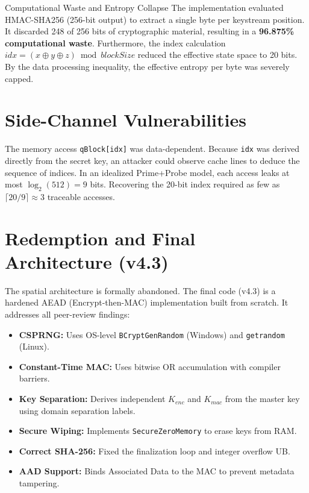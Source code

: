 \documentclass[12pt,a4paper]{article}
\begin{document}
\begin{critiquebox}{Computational Waste and Entropy Collapse}
The implementation evaluated HMAC-SHA256 (256-bit output) to extract a single byte per keystream position. It discarded 248 of 256 bits of cryptographic material, resulting in a \textbf{96.875\% computational waste}. Furthermore, the index calculation $idx = (x \oplus y \oplus z) \bmod blockSize$ reduced the effective state space to 20 bits. By the data processing inequality, the effective entropy per byte was severely capped.
\end{critiquebox}

\section{Side-Channel Vulnerabilities}
The memory access \texttt{qBlock[idx]} was data-dependent. Because \texttt{idx} was derived directly from the secret key, an attacker could observe cache lines to deduce the sequence of indices. In an idealized Prime+Probe model, each access leaks at most $\log_2(512) = 9$ bits. Recovering the 20-bit index required as few as \(\lceil 20/9 \rceil \approx 3\) traceable accesses.

\section{Redemption and Final Architecture (v4.3)}
The spatial architecture is formally abandoned. The final code (v4.3) is a hardened AEAD (Encrypt-then-MAC) implementation built from scratch. It addresses all peer-review findings:
\begin{itemize}
    \item \textbf{CSPRNG:} Uses OS-level \texttt{BCryptGenRandom} (Windows) and \texttt{getrandom} (Linux).
    \item \textbf{Constant-Time MAC:} Uses bitwise OR accumulation with compiler barriers.
    \item \textbf{Key Separation:} Derives independent \(K_{enc}\) and \(K_{mac}\) from the master key using domain separation labels.
    \item \textbf{Secure Wiping:} Implements \texttt{SecureZeroMemory} to erase keys from RAM.
    \item \textbf{Correct SHA-256:} Fixed the finalization loop and integer overflow UB.
    \item \textbf{AAD Support:} Binds Associated Data to the MAC to prevent metadata tampering.
\end{itemize}
\end{document}
